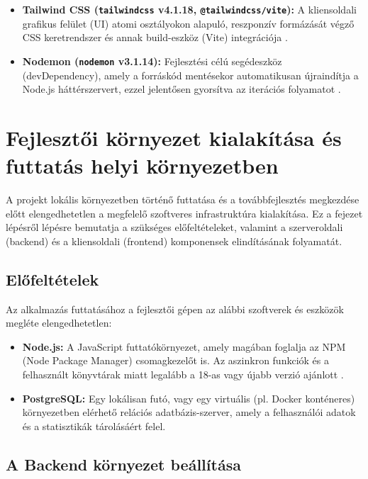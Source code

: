 \begin{itemize}
    \item \textbf{Tailwind CSS (\texttt{tailwindcss} v4.1.18, \texttt{@tailwindcss/vite}):} A kliensoldali grafikus felület (UI) atomi osztályokon alapuló, reszponzív formázását végző CSS keretrendszer és annak build-eszköz (Vite) integrációja \cite{tailwindcss}.
    
    \item \textbf{Nodemon (\texttt{nodemon} v3.1.14):} Fejlesztési célú segédeszköz (devDependency), amely a forráskód mentésekor automatikusan újraindítja a Node.js háttérszervert, ezzel jelentősen gyorsítva az iterációs folyamatot \cite{nodemon}.
\end{itemize}

\section{Fejlesztői környezet kialakítása és futtatás helyi környezetben}
\label{sec:local_setup}

A projekt lokális környezetben történő futtatása és a továbbfejlesztés megkezdése előtt elengedhetetlen a megfelelő szoftveres infrastruktúra kialakítása. Ez a fejezet lépésről lépésre bemutatja a szükséges előfeltételeket, valamint a szerveroldali (backend) és a kliensoldali (frontend) komponensek elindításának folyamatát.

\subsection{Előfeltételek}
\label{subsec:prerequisites}

Az alkalmazás futtatásához a fejlesztői gépen az alábbi szoftverek és eszközök megléte elengedhetetlen:
\begin{itemize}
    \item \textbf{Node.js:} A JavaScript futtatókörnyezet, amely magában foglalja az NPM (Node Package Manager) csomagkezelőt is. Az aszinkron funkciók és a felhasznált könyvtárak miatt legalább a 18-as vagy újabb verzió ajánlott \cite{nodejs}.
    \item \textbf{PostgreSQL:} Egy lokálisan futó, vagy egy virtuális (pl. Docker konténeres) környezetben elérhető relációs adatbázis-szerver, amely a felhasználói adatok és a statisztikák tárolásáért felel.
\end{itemize}

\subsection{A Backend környezet beállítása}
\label{subsec:backend_setup}

